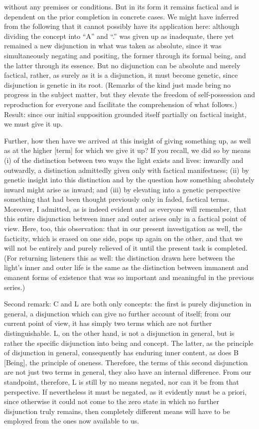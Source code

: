 without any premises or conditions.
But in its form it remains factical and is dependent
on the prior completion in concrete cases.
We might have inferred from the following
that it cannot possibly have its application here:
although dividing the concept
into “A” and “.” was given up as inadequate,
there yet remained a new disjunction
in what was taken as absolute,
since it was simultaneously negating and positing,
the former through its formal being,
and the latter through its essence.
But no disjunction can be absolute and merely factical,
rather, as surely as it is a disjunction,
it must become genetic,
since disjunction is genetic in its root.
(Remarks of the kind just made bring
no progress in the subject matter,
but they elevate the freedom of
self-possession and reproduction for everyone
and facilitate the comprehension of what follows.)
Result: since our initial supposition
grounded itself partially on factical insight,
we must give it up.

Further, how then have we arrived at
this insight of giving something up,
as well as at the higher [term]
for which we give it up?
If you recall, we did so by means
(i) of the distinction between two ways
the light exists and lives: inwardly and outwardly,
a distinction admittedly given only with factical manifestness;
(ii) by genetic insight into this distinction and by the question
how something absolutely inward might arise as inward;
and (iii) by elevating into a genetic perspective
something that had been thought previously
only in faded, factical terms.
Moreover, I admitted, as is indeed evident
and as everyone will remember,
that this entire disjunction between inner and outer
arises only in a factical point of view.
Here, too, this observation:
that in our present investigation as well,
the facticity, which is erased on one side,
pops up again on the other,
and that we will not be entirely and purely relieved of it
until the present task is completed.
(For returning listeners this as well:
the distinction drawn here
between the light's inner and outer life is
the same as the distinction
between immanent and emanent forms of existence
that was so important and meaningful in the previous series.)

Second remark: C and L are both only concepts:
the first is purely disjunction in general,
a disjunction which can give no further account of itself;
from our current point of view, it has simply two terms which are
not further distinguishable.
L, on the other hand, is not a disjunction in general,
but is rather the specific disjunction into being and concept.
The latter, as the principle of disjunction in general,
consequently has enduring inner content,
as does B [Being], the principle of oneness.
Therefore, the terms of this second disjunction are not
just two terms in general, they also have an internal difference.
From our standpoint, therefore, L is still by no means negated,
nor can it be from that perspective.
If nevertheless it must be negated,
as it evidently must be a priori,
since otherwise it could not come to the zero state
in which no further disjunction truly remains,
then completely different means will have to be employed
from the ones now available to us.

